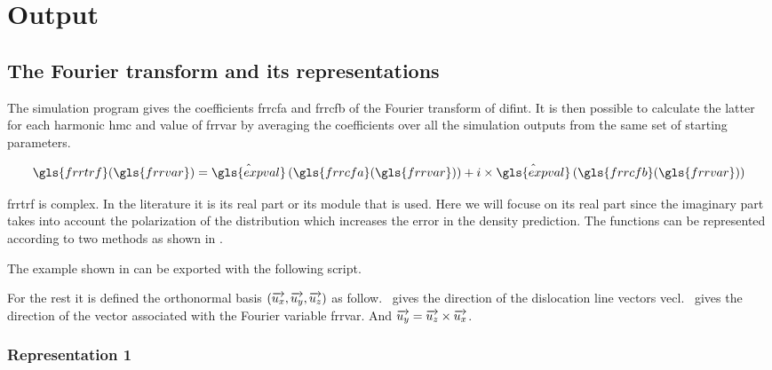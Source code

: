 \section{Output}

\subsection{The Fourier transform and its representations}

The simulation program gives the coefficients \gls{frrcfa} and \gls{frrcfb} of the Fourier transform of \gls{difint}.
It is then possible to calculate the latter for each harmonic \gls{hmc} and value of \gls{frrvar} by averaging the coefficients over all the simulation outputs from the same set of starting parameters.

\begin{equation}\label{eq:fourier-amplitude}
  \gls{frrtrf}(\gls{frrvar}) =
    \hat{\gls{expval}} \left( \gls{frrcfa}(\gls{frrvar}) \right) + i \times \hat{\gls{expval}} \left( \gls{frrcfb}(\gls{frrvar}) \right)
\end{equation}

\medskip

\gls{frrtrf} is complex.
In the literature it is its real part or its module that is used.
Here we will focuse on its real part since the imaginary part takes into account the polarization of the distribution which increases the error in the density prediction.
The functions can be represented according to two methods as shown in .


The example shown in  can be exported with the following script.


\bigskip

For the rest it is defined the orthonormal basis \( \left( \overrightarrow{u_x}, \overrightarrow{u_y}, \overrightarrow{u_z} \right) \) as follow.
\uz \ gives the direction of the dislocation line vectors \gls{vecl}.
\ux \ gives the direction of the vector associated with the Fourier variable \gls{frrvar}.
And \( \overrightarrow{u_y} = \overrightarrow{u_z} \times \overrightarrow{u_x} \).

\subsubsection{Representation 1}\label{sec:representation-1}

